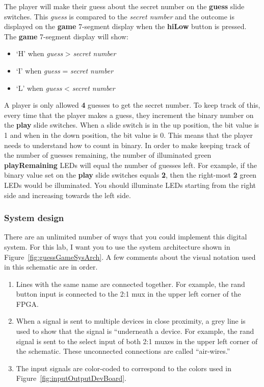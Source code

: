 The player will make their guess about the secret number on the
\textbf{guess} slide switches. This \emph{guess} is compared to the
\emph{secret number} and the outcome is displayed on the \textbf{game}
7-segment display when the \textbf{hiLow} button is pressed. The
\textbf{game} 7-segment display will show:

\begin{itemize}
\item   `H' when \emph{guess} \textgreater{} \emph{secret number}
\item   `I' when \emph{guess} = \emph{secret number}
\item   `L' when \emph{guess} \textless{} \emph{secret number}
\end{itemize}

A player is only allowed \textbf{4} guesses to get the secret number. To
keep track of this, every time that the player makes a guess, they
increment the binary number on the \textbf{play} slide switches. When a
slide switch is in the up position, the bit value is 1 and when in the
down position, the bit value is 0. This means that the player needs to
understand how to count in binary. In order to make keeping track of the
number of guesses remaining, the number of illuminated green
\textbf{playRemaining} LEDs will equal the number of guesses left. For
example, if the binary value set on the \textbf{play} slide switches
equals \textbf{2}, then the right-most \textbf{2} green LEDs would be
illuminated. You should illuminate LEDs starting from the right side and
increasing towards the left side.

\subsubsection{System design}

There are an unlimited number of ways that you could implement this
digital system. For this lab, I want you to use the system architecture
shown in Figure~\ref{fig:guessGameSysArch}. A few comments about the visual notation used in this
schematic are in order.

\begin{enumerate}
\def\labelenumi{\arabic{enumi})}
\item
  Lines with the same name are connected together. For example, the rand
  button input is connected to the 2:1 mux in the upper left corner of
  the FPGA.
\item
  When a signal is sent to multiple devices in close proximity, a grey
  line is used to show that the signal is ``underneath a device. For
  example, the rand signal is sent to the select input of both 2:1 muxes
  in the upper left corner of the schematic. These unconnected
  connections are called ``air-wires.''
\item
  The input signals are color-coded to correspond to the colors used in
  Figure~\ref{fig:inputOutputDevBoard}.
\end{enumerate}

